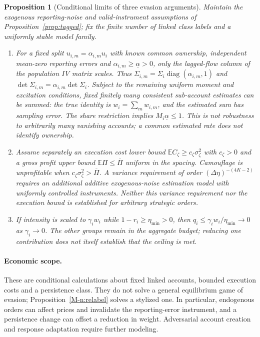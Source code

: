 \documentclass[12pt]{article}
\newtheorem{proposition}[theorem]{Proposition}
\theoremstyle{definition}
\theoremstyle{remark}
\begin{document}
\begin{proposition}[Conditional limits of three evasion arguments]\label{prop:strategic}
Maintain the exogenous reporting-noise and valid-instrument assumptions of Proposition~\ref{prop:tagged}; fix the finite number of linked class labels and a uniformly stable model family.
\begin{enumerate}[label=(\roman*)]
\item For a fixed split $u_{i,m}=\alpha_{i,m}u_i$ with known common ownership, independent mean-zero reporting errors and $\alpha_{i,m}\ge\underline\alpha>0$, only the lagged-flow column of the population IV matrix scales. Thus $\Sigma_{i,m}=\Sigma_i\operatorname{diag}(\alpha_{i,m},1)$ and $\det\Sigma_{i,m}=\alpha_{i,m}\det\Sigma_i$. Subject to the remaining uniform moment and excitation conditions, fixed finitely many consistent sub-account estimates can be summed: the true identity is $w_i=\sum_m w_{i,m}$, and the estimated sum has sampling error. The share restriction implies $M_i\underline\alpha\le1$. This is not robustness to arbitrarily many vanishing accounts; a common estimated rate does not identify ownership.
\item Assume separately an execution cost lower bound $\mathbb E C_\zeta\ge c_\zeta\sigma_\zeta^2$ with $c_\zeta>0$ and a gross profit upper bound $\mathbb E\Pi\le\overline\Pi$ uniform in the spacing. Camouflage is unprofitable when $c_\zeta\sigma_\zeta^2>\overline\Pi$. A variance requirement of order $(\Delta\eta)^{-(4K-2)}$ requires an additional additive exogenous-noise estimation model with uniformly controlled instruments. Neither this variance requirement nor the execution bound is established for arbitrary strategic orders.
\item If intensity is scaled to $\gamma_iw_i$ while $1-r_i\ge\eta_{\min}>0$, then $q_i\le\gamma_iw_i/\eta_{\min}\to0$ as $\gamma_i\to0$. The other groups remain in the aggregate budget; reducing one contribution does not itself establish that the ceiling is met.
\end{enumerate}
\end{proposition}

\paragraph{Economic scope.} These are conditional calculations about fixed linked accounts, bounded execution costs and a persistence class. They do not solve a general equilibrium game of evasion; Proposition~\ref{M-n:relabel} solves a stylized one. In particular, endogenous orders can affect prices and invalidate the reporting-error instrument, and a persistence change can offset a reduction in weight. Adversarial account creation and response adaptation require further modeling.
\end{document}
